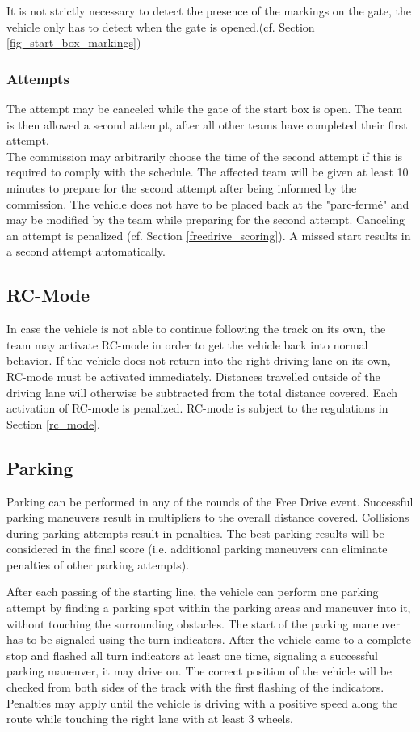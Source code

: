 It is not strictly necessary to detect the presence of the markings on the
gate, the vehicle only has to detect when the gate is opened.(cf. Section
\ref{fig_start_box_markings})

\subsubsection{Attempts}

The attempt may be canceled while the gate of the start box is open. The team
is then allowed a second attempt, after all other teams have completed their
first attempt.\\ The commission may arbitrarily choose the time of the second
attempt if this is required to comply with the schedule. The affected team will
be given at least 10 minutes to prepare for the second attempt after being
informed by the commission. The vehicle does not have to be placed back at the
"parc-fermé" and may be modified by the team while preparing for the second
attempt. Canceling an attempt is penalized (cf. Section
\ref{freedrive_scoring}). A missed start results in a second attempt
automatically.

\subsection{RC-Mode}

In case the vehicle is not able to continue following the track on its own, the
team may activate RC-mode in order to get the vehicle back into normal
behavior. If the vehicle does not return into the right driving lane on its
own, RC-mode must be activated immediately. Distances travelled outside of the
driving lane will otherwise be subtracted from the total distance covered. Each
activation of RC-mode is penalized. RC-mode is subject to the regulations in
Section \ref{rc_mode}.

\subsection{Parking}

Parking can be performed in any of the rounds of the Free Drive event.
Successful parking maneuvers result in multipliers to the overall distance
covered. Collisions during parking attempts result in penalties. The best
parking results will be considered in the final score (i.e. additional parking
maneuvers can eliminate penalties of other parking attempts).

After each passing of the starting line, the vehicle can perform one parking
attempt by finding a parking spot within the parking areas and maneuver into
it, without touching the surrounding obstacles. The start of the parking
maneuver has to be signaled using the turn indicators. After the vehicle came
to a complete stop and flashed all turn indicators at least one time, signaling
a successful parking maneuver, it may drive on. The correct position of the
vehicle will be checked from both sides of the track with the first flashing of
the indicators. Penalties may apply until the vehicle is driving with a
positive speed along the route while touching the right lane with at least 3
wheels.

